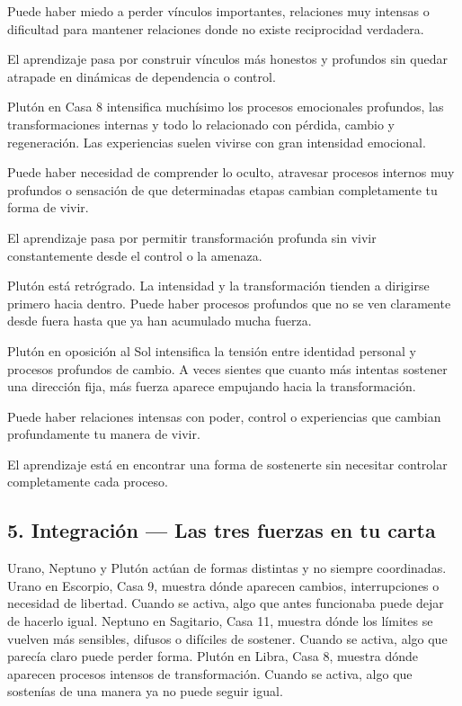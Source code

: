 \documentclass[11pt,a4paper]{article}
\begin{document}
Puede haber miedo a perder vínculos importantes, relaciones muy intensas o dificultad para mantener relaciones donde no existe reciprocidad verdadera.

El aprendizaje pasa por construir vínculos más honestos y profundos sin quedar atrapade en dinámicas de dependencia o control.

Plutón en Casa 8 intensifica muchísimo los procesos emocionales profundos, las transformaciones internas y todo lo relacionado con pérdida, cambio y regeneración. Las experiencias suelen vivirse con gran intensidad emocional.

Puede haber necesidad de comprender lo oculto, atravesar procesos internos muy profundos o sensación de que determinadas etapas cambian completamente tu forma de vivir.

El aprendizaje pasa por permitir transformación profunda sin vivir constantemente desde el control o la amenaza.

Plutón está retrógrado. La intensidad y la transformación tienden a dirigirse primero hacia dentro. Puede haber procesos profundos que no se ven claramente desde fuera hasta que ya han acumulado mucha fuerza.

Plutón en oposición al Sol intensifica la tensión entre identidad personal y procesos profundos de cambio. A veces sientes que cuanto más intentas sostener una dirección fija, más fuerza aparece empujando hacia la transformación.

Puede haber relaciones intensas con poder, control o experiencias que cambian profundamente tu manera de vivir.

El aprendizaje está en encontrar una forma de sostenerte sin necesitar controlar completamente cada proceso.

\vspace{0.8cm}

\subsection{5. Integración — Las tres fuerzas en tu carta}

Urano, Neptuno y Plutón actúan de formas distintas y no siempre coordinadas. Urano en Escorpio, Casa 9, muestra dónde aparecen cambios, interrupciones o necesidad de libertad. Cuando se activa, algo que antes funcionaba puede dejar de hacerlo igual. Neptuno en Sagitario, Casa 11, muestra dónde los límites se vuelven más sensibles, difusos o difíciles de sostener. Cuando se activa, algo que parecía claro puede perder forma. Plutón en Libra, Casa 8, muestra dónde aparecen procesos intensos de transformación. Cuando se activa, algo que sostenías de una manera ya no puede seguir igual.
\end{document}
